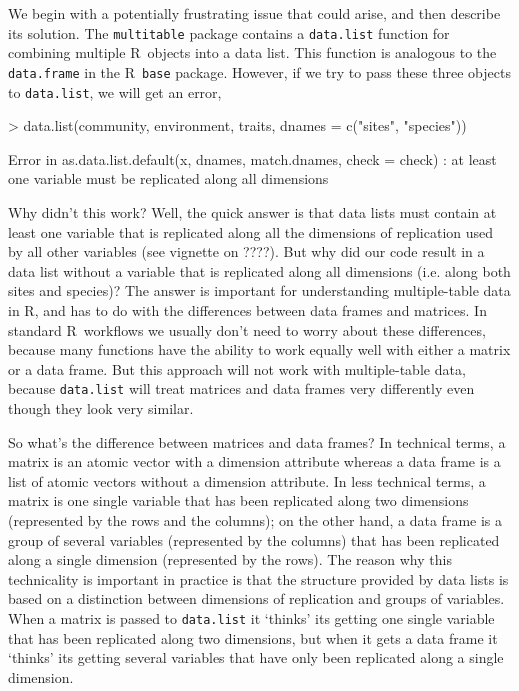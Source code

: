 \documentclass{article}
\newcommand{\R}{{\sf R}}
\newcommand{\code}[1]{\texttt{#1}}
\numberwithin{exercise}{section}
\begin{document}
We begin with a potentially frustrating issue that could arise, and then describe its solution.  The \code{multitable} package contains a \code{data.list} function for combining multiple \R\ objects into a data list.  This function is analogous to the \code{data.frame} in the \R\ \code{base} package.  However, if we try to pass these three objects to \code{data.list}, we will get an error,
\begin{Schunk}
\begin{Sinput}
> data.list(community, environment, traits, dnames = c("sites", "species"))
\end{Sinput}
\end{Schunk}
\begin{Schunk}
\begin{Soutput}
Error in as.data.list.default(x, dnames, match.dnames, check = check) : 
  at least one variable must be replicated along all dimensions
\end{Soutput}
\end{Schunk}

Why didn't this work?  Well, the quick answer is that data lists must contain at least one variable that is replicated along all the dimensions of replication used by all other variables (see vignette on ????).  But why did our code result in a data list without a variable that is replicated along all dimensions (i.e. along both sites and species)?  The answer is important for understanding multiple-table data in \R, and has to do with the differences between data frames and matrices.  In standard \R\ workflows we usually don't need to worry about these differences, because many functions have the ability to work equally well with either a matrix or a data frame.  But this approach will not work with multiple-table data, because \code{data.list} will treat matrices and data frames very differently even though they look very similar.

So what's the difference between matrices and data frames?  In technical terms, a matrix is an atomic vector with a dimension attribute whereas a data frame is a list of atomic vectors without a dimension attribute.  In less technical terms, a matrix is one single variable that has been replicated along two dimensions (represented by the rows and the columns); on the other hand, a data frame is a group of several variables (represented by the columns) that has been replicated along a single dimension (represented by the rows).  The reason why this technicality is important in practice is that the structure provided by data lists is based on a distinction between dimensions of replication and groups of variables.  When a matrix is passed to \code{data.list} it `thinks' its getting one single variable that has been replicated along two dimensions, but when it gets a data frame it `thinks' its getting several variables that have only been replicated along a single dimension.
\end{document}
